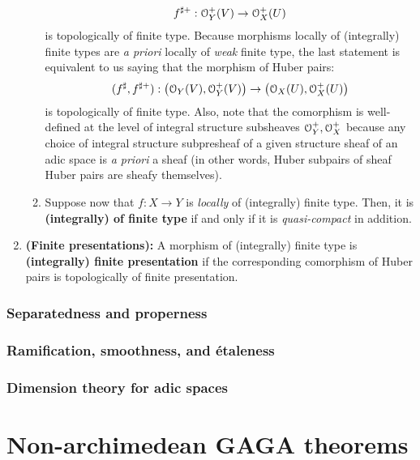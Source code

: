 \begin{definition}
\begin{enumerate}
\begin{enumerate}
                                        $$f^{\sharp +}: \mathcal{O}_Y^+(V) \to \mathcal{O}_X^+(U)$$
                                    is topologically of finite type. Because morphisms locally of (integrally) finite types are \textit{a priori} locally of \textit{weak} finite type, the last statement is equivalent to us saying that the morphism of Huber pairs:
                                        $$(f^{\sharp}, f^{\sharp +}): \left(\mathcal{O}_Y(V), \mathcal{O}_Y^+(V)\right) \to \left(\mathcal{O}_X(U), \mathcal{O}_X^+(U)\right)$$
                                    is topologically of finite type. Also, note that the comorphism is well-defined at the level of integral structure subsheaves $\mathcal{O}_Y^+, \mathcal{O}_X^+$ because any choice of integral structure subpresheaf of a given structure sheaf of an adic space is \textit{a priori} a sheaf (in other words, Huber subpairs of sheaf Huber pairs are sheafy themselves). 
                                    \item Suppose now that $f: X \to Y$ is \textit{locally} of (integrally) finite type. Then, it is \textbf{(integrally) of finite type} if and only if it is \textit{quasi-compact} in addition.
                                \end{enumerate}
                            \item \textbf{(Finite presentations):} A morphism of (integrally) finite type is \textbf{(integrally) finite presentation} if the corresponding comorphism of Huber pairs is topologically of finite presentation.
                        \end{enumerate}
                \end{definition}
            
            \subsubsection{Separatedness and properness}
            
            \subsubsection{Ramification, smoothness, and \'etaleness}
            
            \subsubsection{Dimension theory for adic spaces}
            
    \section{Non-archimedean GAGA theorems}
                